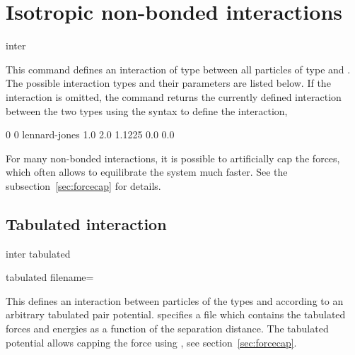\section{Isotropic non-bonded interactions}
\label{sec:inter-nb}

\begin{essyntax*}
  inter  
\end{essyntax*}
This command defines an interaction of type  between
all particles of type  and . The possible
interaction types and their parameters are listed below. If the
interaction is omitted, the command returns the currently defined
interaction between the two types using the syntax to define the
interaction, \eg
\begin{tclcode}
  0 0 lennard-jones 1.0 2.0 1.1225 0.0 0.0
\end{tclcode}

For many non-bonded interactions, it is possible to artificially cap
the forces, which often allows to equilibrate the system much
faster. See the subsection~\ref{sec:forcecap} for details.


\subsection{Tabulated interaction}
\label{sec:tabnonbonded}

\begin{essyntax}
  inter   tabulated %
  \begin{features}
  \end{features}
\end{essyntax}
\begin{pysyntax}
  \begin{features}
  \end{features}
		{tabulated}
		{
			filename=
		}
\end{pysyntax}

This defines an interaction between particles of the types  and
 according to an arbitrary tabulated pair potential. 
specifies a file which contains the tabulated forces and energies as a function
of the separation distance. The tabulated potential allows capping the force
using , see section~\ref{sec:forcecap}.


